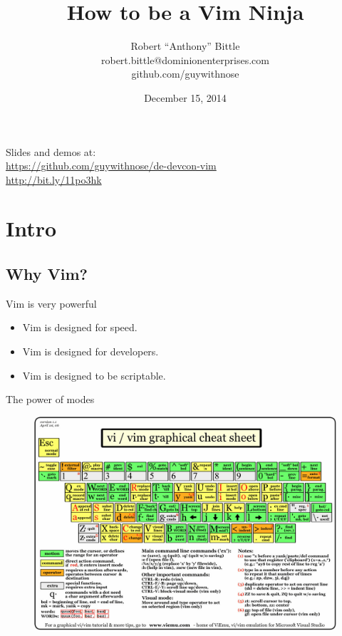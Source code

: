 \documentclass{beamer}
\title[How to be a Vim Ninja]{How to be a Vim Ninja}
\author{\hspace{12pt}Robert “Anthony” Bittle\hspace{12pt}\\\hspace{12pt}robert.bittle@dominionenterprises.com\hspace{12pt}\\\hspace{12pt}github.com/guywithnose\hspace{12pt}}
\date{December 15, 2014}
\begin{document}
    \begin{frame}
        \titlepage
        Slides and demos at:\\
        \href{https://github.com/guywithnose/de-devcon-vim}{https://github.com/guywithnose/de-devcon-vim}\\
        \href{http://bit.ly/11po3hk}{http://bit.ly/11po3hk}
    \end{frame}

    \section{Intro}
    \subsection{Why Vim?}
    \begin{frame}{Vim is very powerful}
        \begin{itemize}
            \item Vim is designed for speed.
            \item Vim is designed for developers.
            \item Vim is designed to be scriptable.
        \end{itemize}
    \end{frame}
    \begin{frame}{The power of modes}
        \begin{figure}
            \centering
            \includegraphics[width=0.8\linewidth]{vi-vim-cheat-sheet.jpg}
        \end{figure}
    \end{frame}
\end{document}
